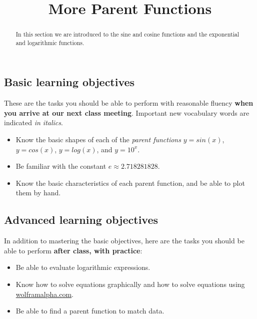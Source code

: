 \documentclass{ximera}
\title{More Parent Functions}
\begin{document}
\begin{abstract}
In this section we are introduced to the sine and cosine functions and
the exponential and logarithmic functions.
\end{abstract}
\maketitle

\subsection*{Basic learning objectives}

These are the tasks you should be able to perform with reasonable
fluency \textbf{when you arrive at our next class meeting}. Important
new vocabulary words are indicated \emph{in italics}.

\begin{itemize}
\item Know the basic shapes of each of the \emph{parent functions} $y=sin(x)$, $y=cos(x)$, $y=log(x)$, and  $y=10^x$.
	\item Be familiar with the constant $e\approx 2.718281828$.
	\item Know the basic characteristics of each parent function, and be able to plot them by hand.
\end{itemize}

\subsection*{Advanced learning objectives}

In addition to mastering the basic objectives, here are the tasks you should be able to perform \textbf{after class, with practice}: 

\begin{itemize}
	\item Be able to evaluate logarithmic expressions.
	\item Know how to solve equations graphically and how to solve equations using \url{wolframalpha.com}.
	\item Be able to find a parent function to match data.
\end{itemize}
\end{document}
